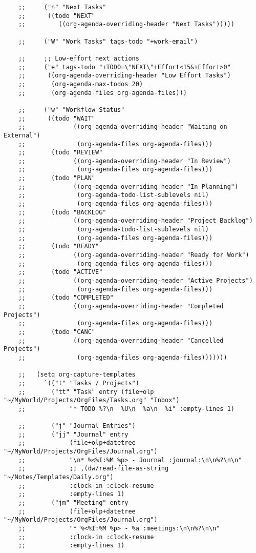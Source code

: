 \documentclass[11pt]{article}
\begin{document}
\begin{verbatim}
    ;;     ("n" "Next Tasks"
    ;;      ((todo "NEXT"
    ;;         ((org-agenda-overriding-header "Next Tasks")))))

    ;;     ("W" "Work Tasks" tags-todo "+work-email")

    ;;     ;; Low-effort next actions
    ;;     ("e" tags-todo "+TODO=\"NEXT\"+Effort<15&+Effort>0"
    ;;      ((org-agenda-overriding-header "Low Effort Tasks")
    ;;       (org-agenda-max-todos 20)
    ;;       (org-agenda-files org-agenda-files)))

    ;;     ("w" "Workflow Status"
    ;;      ((todo "WAIT"
    ;;             ((org-agenda-overriding-header "Waiting on External")
    ;;              (org-agenda-files org-agenda-files)))
    ;;       (todo "REVIEW"
    ;;             ((org-agenda-overriding-header "In Review")
    ;;              (org-agenda-files org-agenda-files)))
    ;;       (todo "PLAN"
    ;;             ((org-agenda-overriding-header "In Planning")
    ;;              (org-agenda-todo-list-sublevels nil)
    ;;              (org-agenda-files org-agenda-files)))
    ;;       (todo "BACKLOG"
    ;;             ((org-agenda-overriding-header "Project Backlog")
    ;;              (org-agenda-todo-list-sublevels nil)
    ;;              (org-agenda-files org-agenda-files)))
    ;;       (todo "READY"
    ;;             ((org-agenda-overriding-header "Ready for Work")
    ;;              (org-agenda-files org-agenda-files)))
    ;;       (todo "ACTIVE"
    ;;             ((org-agenda-overriding-header "Active Projects")
    ;;              (org-agenda-files org-agenda-files)))
    ;;       (todo "COMPLETED"
    ;;             ((org-agenda-overriding-header "Completed Projects")
    ;;              (org-agenda-files org-agenda-files)))
    ;;       (todo "CANC"
    ;;             ((org-agenda-overriding-header "Cancelled Projects")
    ;;              (org-agenda-files org-agenda-files)))))))

    ;;   (setq org-capture-templates
    ;;     `(("t" "Tasks / Projects")
    ;;       ("tt" "Task" entry (file+olp "~/MyWorld/Projects/OrgFiles/Tasks.org" "Inbox")
    ;;            "* TODO %?\n  %U\n  %a\n  %i" :empty-lines 1)

    ;;       ("j" "Journal Entries")
    ;;       ("jj" "Journal" entry
    ;;            (file+olp+datetree "~/MyWorld/Projects/OrgFiles/Journal.org")
    ;;            "\n* %<%I:%M %p> - Journal :journal:\n\n%?\n\n"
    ;;            ;; ,(dw/read-file-as-string "~/Notes/Templates/Daily.org")
    ;;            :clock-in :clock-resume
    ;;            :empty-lines 1)
    ;;       ("jm" "Meeting" entry
    ;;            (file+olp+datetree "~/MyWorld/Projects/OrgFiles/Journal.org")
    ;;            "* %<%I:%M %p> - %a :meetings:\n\n%?\n\n"
    ;;            :clock-in :clock-resume
    ;;            :empty-lines 1)


\end{verbatim}
\end{document}
